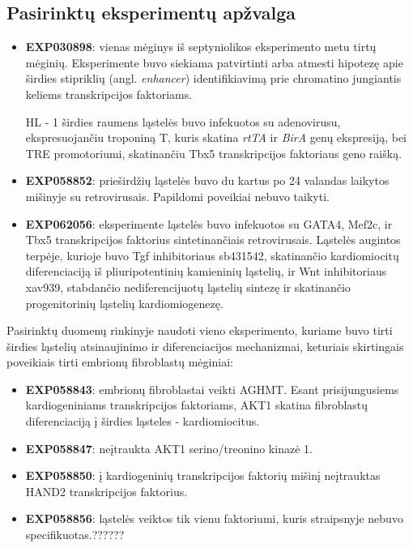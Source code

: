 \documentclass[12pt]{article}
\begin{document}
\subsection{Pasirinktų eksperimentų apžvalga}
\begin{itemize}
    \item \textbf{EXP030898}: vienas mėginys iš septyniolikos eksperimento
        metu tirtų mėginių. Eksperimente buvo siekiama patvirtinti arba
        atmesti hipotezę apie širdies stipriklių (angl. \emph{enhancer})
        identifikiavimą prie chromatino jungiantis keliems transkripcijos
        faktoriams.

        HL - 1 širdies raumens ląstelės buvo infekuotos su adenovirusu,
        ekspresuojančiu troponiną T, kuris skatina \emph{rtTA} ir \emph{BirA}
        genų ekspresiją, bei TRE promotoriumi, skatinančiu Tbx5 transkripcijos
        faktoriaus geno raišką.
    \item \textbf{EXP058852}: prieširdžių ląstelės buvo du kartus po 24
        valandas laikytos mišinyje su retrovirusais. Papildomi poveikiai nebuvo
        taikyti.
    \item \textbf{EXP062056}: eksperimente ląstelės buvo infekuotos su GATA4,
        Mef2c, ir Tbx5 transkripcijos faktorius sintetinančiais retrovirusais.
        Ląstelės augintos terpėje, kurioje buvo {Tgf\textbeta} inhibitoriaus
        sb431542, skatinančio kardiomiocitų diferenciaciją iš pliuripotentinių
        kamieninių ląstelių, ir Wnt inhibitoriaus xav939, stabdančio
        nediferencijuotų ląstelių sintezę ir skatinančio progenitorinių
        ląstelių kardiomiogenezę.
\end{itemize}

Pasirinktų duomenų rinkinyje naudoti vieno eksperimento, kuriame buvo tirti
širdies ląstelių atsinaujinimo ir diferenciacijos mechanizmai, keturiais
skirtingais poveikiais tirti embrionų fibroblastų mėginiai:

\begin{itemize}
    \item \textbf{EXP058843}: embrionų fibroblastai veikti AGHMT. Esant
        prisijungusiems kardiogeniniams transkripcijos faktoriams, AKT1
        skatina fibroblastų diferenciaciją į širdies ląsteles - kardiomiocitus.
    \item \textbf{EXP058847}: neįtraukta AKT1 serino/treonino kinazė 1.
    \item \textbf{EXP058850}: į kardiogeninių transkripcijos faktorių mišinį
        neįtrauktas HAND2 transkripcijos faktorius.
    \item \textbf{EXP058856}: ląstelės veiktos tik vienu faktoriumi, kuris
        straipsnyje nebuvo specifikuotas.??????
  \end{itemize}
\newpage
\end{document}
